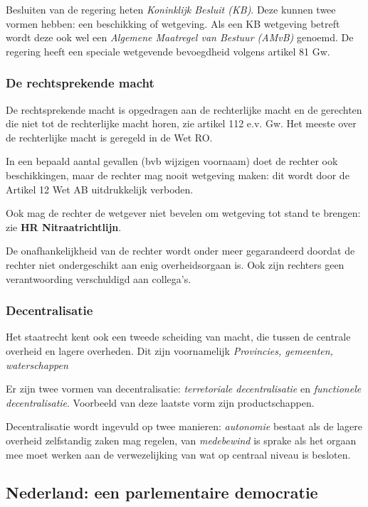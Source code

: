 \documentclass{article}
\begin{document}
Besluiten van de regering heten \emph{Koninklijk Besluit (KB)}. Deze kunnen twee 
vormen hebben: een beschikking of wetgeving. Als een KB wetgeving betreft wordt deze 
ook wel een \emph{Algemene Maatregel van Bestuur (AMvB)} genoemd. De regering 
heeft een speciale wetgevende bevoegdheid volgens artikel 81 Gw.

\subsubsection{De rechtsprekende macht}

De rechtsprekende macht is opgedragen aan de rechterlijke macht en de gerechten 
die niet tot de rechterlijke macht horen, zie artikel 112 e.v. Gw. Het meeste 
over de rechterlijke macht is geregeld in de Wet RO. 

In een bepaald aantal gevallen (bvb wijzigen voornaam) doet de rechter ook 
beschikkingen, maar de rechter mag nooit wetgeving maken: dit wordt door de
Artikel 12 Wet AB uitdrukkelijk verboden.

Ook mag de rechter de wetgever niet bevelen om wetgeving tot stand te brengen:
zie \textbf{HR Nitraatrichtlijn}.

De onafhankelijkheid van de rechter wordt onder meer gegarandeerd doordat de
rechter niet ondergeschikt aan enig overheidsorgaan is. Ook zijn rechters geen
verantwoording verschuldigd aan collega's. 

\subsubsection{Decentralisatie}

Het staatrecht kent ook een tweede scheiding van macht, die tussen de centrale
overheid en lagere overheden. Dit zijn voornamelijk \emph{Provincies,
gemeenten, waterschappen}

Er zijn twee vormen van decentralisatie: \emph{terretoriale decentralisatie} en
\emph{functionele decentralisatie}. Voorbeeld van deze laatste vorm zijn
productschappen. 

Decentralisatie wordt ingevuld op twee manieren: \emph{autonomie} bestaat als
de lagere overheid zelfstandig zaken mag regelen, van \emph{medebewind} is
sprake als het orgaan mee moet werken aan de verwezelijking van wat op centraal
niveau is besloten. 

\subsection{Nederland: een parlementaire democratie}
\end{document}
